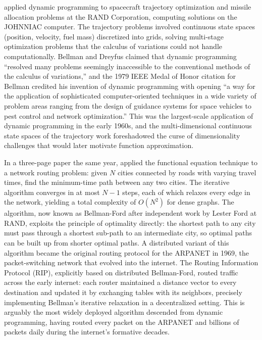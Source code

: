\citet{BellmanDreyfus1962} applied dynamic programming to spacecraft trajectory optimization and missile allocation problems at the RAND Corporation, computing solutions on the JOHNNIAC computer. The trajectory problems involved continuous state spaces (position, velocity, fuel mass) discretized into grids, solving multi-stage optimization problems that the calculus of variations could not handle computationally. Bellman and Dreyfus claimed that dynamic programming ``resolved many problems seemingly inaccessible to the conventional methods of the calculus of variations,'' and the 1979 IEEE Medal of Honor citation for Bellman credited his invention of dynamic programming with opening ``a way for the application of sophisticated computer-oriented techniques in a wide variety of problem areas ranging from the design of guidance systems for space vehicles to pest control and network optimization.'' This was the largest-scale application of dynamic programming in the early 1960s, and the multi-dimensional continuous state spaces of the trajectory work foreshadowed the curse of dimensionality challenges that would later motivate function approximation.

In a three-page paper the same year, \citet{Bellman1958routing} applied the functional equation technique to a network routing problem: given $N$ cities connected by roads with varying travel times, find the minimum-time path between any two cities. The iterative algorithm converges in at most $N - 1$ steps, each of which relaxes every edge in the network, yielding a total complexity of $O(N^2)$ for dense graphs. The algorithm, now known as Bellman-Ford after independent work by Lester Ford at RAND, exploits the principle of optimality directly: the shortest path to any city must pass through a shortest sub-path to an intermediate city, so optimal paths can be built up from shorter optimal paths. A distributed variant of this algorithm became the original routing protocol for the ARPANET in 1969, the packet-switching network that evolved into the internet. The Routing Information Protocol (RIP), explicitly based on distributed Bellman-Ford, routed traffic across the early internet: each router maintained a distance vector to every destination and updated it by exchanging tables with its neighbors, precisely implementing Bellman's iterative relaxation in a decentralized setting. This is arguably the most widely deployed algorithm descended from dynamic programming, having routed every packet on the ARPANET and billions of packets daily during the internet's formative decades.

